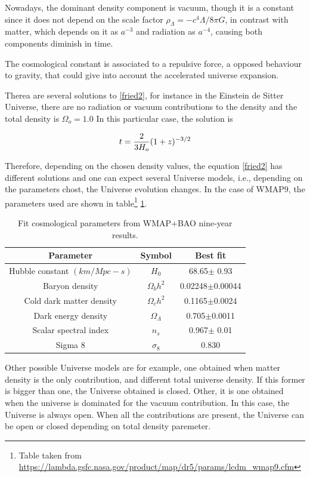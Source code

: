 Nowadays, the dominant density component is vacuum, though it is a constant
since it does not depend on the scale factor $\rho_{\Lambda}=-c^4\Lambda/8\pi G$,
in contrast with matter, which depends on it as $a^{-3}$ and radiation as $a^{-4}$,
causing both components diminish in time. 

The cosmological constant is associated to a repulsive force, a opposed behaviour
to gravity, that could give into account the accelerated universe expansion. 

Therea are several solutions to \ref{fried2}, for instance in the Einstein de 
Sitter Universe, there are no radiation or vacuum contributions to the density
and the total density is $\Omega_o=1.0$ In this particular case, the solution
is

\[
t = \frac{2}{3H_o}(1+z)^{-3/2}
\]

Therefore, depending on the chosen density values, the equation \ref{fried2}
has different solutions and one can expect several Universe models, i.e.,
depending on the parameters chost, the Universe evolution changes.  
In the case of WMAP9, the parameters used are shown in table\footnote{Table taken from \url{https://lambda.gsfc.nasa.gov/product/map/dr5/params/lcdm_wmap9.cfm}} \ref{WMAPtable}. 

\begin{table}
\begin{center}
  \begin{tabular}{ | c | c | c |}
    \hline \hline
    Parameter & Symbol & Best fit \\ \hline \hline 
    Hubble constant $(km/Mpc-s)$ & $H_0$ & 68.65$\pm$ 0.93 \\ \hline
    Baryon density & $\Omega_b h^2$ & 0.02248$\pm$0.00044 \\ \hline
    Cold dark matter density & $\Omega_c h^2$ & 0.1165$\pm$0.0024 \\  \hline
    Dark energy density & $\Omega_\Lambda$ & 0.705$\pm$0.0011\\ \hline
    Scalar spectral index & $n_s$ & 0.967$\pm$ 0.01 \\ \hline
    Sigma 8 & $\sigma_8$& 0.830 \\ \hline
  \end{tabular}
    \caption{ Fit cosmological parameters from WMAP+BAO nine-year results.}
  \label{WMAPtable}
\end{center}
\end{table}

Other possible Universe models are for example, one obtained when matter
density is the only contribution, and different total universe density.
If this former is bigger than one, the Universe obtained is closed. 
Other, it is one obtained when the universe is dominated for the vacuum
contribution. In this case, the Universe is always open. When all the 
contributions are present, the Universe can be open or closed depending on
total density paremeter.

